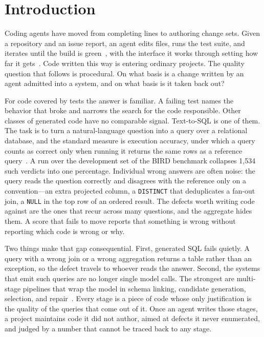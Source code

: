 \section{Introduction}

Coding agents have moved from completing lines to authoring change sets. Given
a repository and an issue report, an agent edits files, runs the test suite,
and iterates until the build is green~\cite{swe-bench}, with the interface it
works through setting how far it gets~\cite{swe-agent}. Code
written this way is entering ordinary projects. The quality question that
follows is procedural. On what basis is a change written by an agent admitted
into a system, and on what basis is it taken back out?

For code covered by tests the answer is familiar. A failing test names the
behavior that broke and narrows the search for the code responsible. Other
classes of generated code have no comparable signal. Text-to-SQL is one of
them. The task is to turn a natural-language question into a query over a
relational database, and the standard measure is execution accuracy, under
which a query counts as correct only when running it returns the same rows as a
reference query~\cite{bird}. A run over the development set of the BIRD
benchmark collapses 1,534 such verdicts into one percentage. Individual wrong
answers are often noise: the query reads the question correctly and disagrees
with the reference only on a convention---an extra projected column, a
\texttt{DISTINCT} that deduplicates a fan-out join, a \texttt{NULL} in the top
row of an ordered result. The defects worth writing code against are the ones
that recur across many questions, and the aggregate hides them. A score that
fails to move reports that something is wrong without reporting which code is
wrong or why.

Two things make that gap consequential. First, generated SQL fails quietly. A
query with a wrong join or a wrong aggregation returns a table rather than an
exception, so the defect travels to whoever reads the answer. Second, the
systems that emit such queries are no longer single model calls. The strongest are
multi-stage pipelines that wrap the model in schema linking, candidate
generation, selection, and
repair~\cite{chase-sql,xiyan-sql,metadata-extraction,agentar-scale-sql}. Every
stage is a piece of code whose only justification is the quality of the queries
that come out of it. Once an agent writes those stages, a project maintains code it
did not author, aimed at defects it never enumerated, and judged by a number
that cannot be traced back to any stage.

